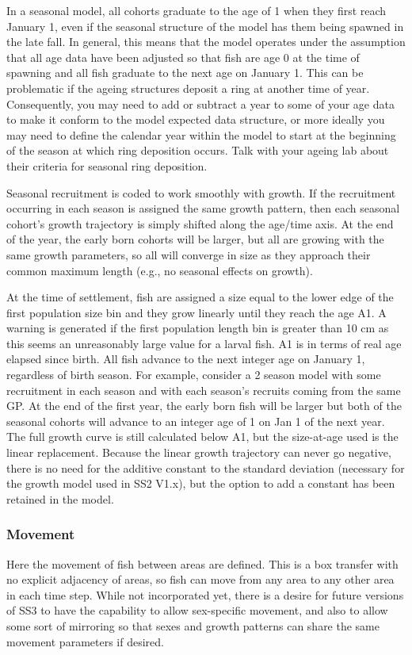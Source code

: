 In a seasonal model, all cohorts graduate to the age of 1 when they first reach January 1, even if the seasonal structure of the model has them being spawned in the late fall. In general, this means that the model operates under the assumption that all age data have been adjusted so that fish are age 0 at the time of spawning and all fish graduate to the next age on January 1. This can be problematic if the ageing structures deposit a ring at another time of year. Consequently, you may need to add or subtract a year to some of your age data to make it conform to the model expected data structure, or more ideally you may need to define the calendar year within the model to start at the beginning of the season at which ring deposition occurs. Talk with your ageing lab about their criteria for seasonal ring deposition.
		
Seasonal recruitment is coded to work smoothly with growth. If the recruitment occurring in each season is assigned the same growth pattern, then each seasonal cohort’s growth trajectory is simply shifted along the age/time axis. At the end of the year, the early born cohorts will be larger, but all are growing with the same growth parameters, so all will converge in size as they approach their common maximum length (e.g., no seasonal effects on growth).
	
At the time of settlement, fish are assigned a size equal to the lower edge of the first population size bin and they grow linearly until they reach the age A1. A warning is generated if the first population length bin is greater than 10 cm as this seems an unreasonably large value for a larval fish.  A1 is in terms of real age elapsed since birth. All fish advance to the next integer age on January 1, regardless of birth season. For example, consider a 2 season model with some recruitment in each season and with each season's recruits coming from the same GP.  At the end of the first year, the early born fish will be larger but both of the seasonal cohorts will advance to an integer age of 1 on Jan 1 of the next year.  The full growth curve is still calculated below A1, but the size-at-age used is the linear replacement. Because the linear growth trajectory can never go negative, there is no need for the additive constant to the standard deviation (necessary for the growth model used in SS2 V1.x), but the option to add a constant has been retained in the model.

\subsubsection{Movement}
Here the movement of fish between areas are defined.  This is a box transfer with no explicit adjacency of areas, so fish can move from any area to any other area in each time step. While not incorporated yet, there is a desire for future versions of SS3 to have the capability to allow sex-specific movement, and also to allow some sort of mirroring so that sexes and growth patterns can share the same movement parameters if desired.

